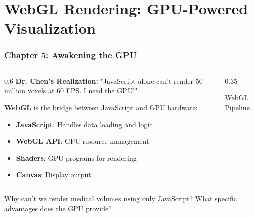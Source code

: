 \section{WebGL Rendering: GPU-Powered Visualization}

\begin{frame}
\frametitle{Chapter 5: Awakening the GPU}

\begin{columns}[T]
\begin{column}{0.6\textwidth}
  \textbf{Dr. Chen's Realization:} "JavaScript alone can't render 50 million voxels at 60 FPS. I need the GPU!"
  
  \vspace{0.5cm}
  \textbf{WebGL} is the bridge between JavaScript and GPU hardware:
  \begin{itemize}
    \item \textbf{JavaScript}: Handles data loading and logic
    \item \textbf{WebGL API}: GPU resource management
    \item \textbf{Shaders}: GPU programs for rendering
    \item \textbf{Canvas}: Display output
  \end{itemize}
\end{column}
\begin{column}{0.35\textwidth}
  \begin{center}
    \vspace{0.3cm}
    {\small\color{medicalgray}WebGL Pipeline}
  \end{center}
\end{column}
\end{columns}

Why can't we render medical volumes using only JavaScript? What specific advantages does the GPU provide?
\end{frame}

